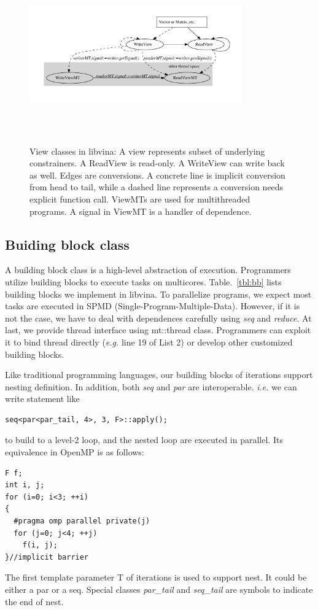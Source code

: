 \begin{figure}
\includegraphics[width=3.6in,height=3.0in]{../relationship_views}
\caption{View classes in libvina: A view represents subset of
  underlying constrainers. A ReadView is read-only. A WriteView
  can write back as well. Edges are  conversions. A concrete line is implicit conversion from head to
  tail, while a dashed line represents a conversion needs explicit function
  call. ViewMTs are used for multithreaded programs. A
  signal in ViewMT is a handler of dependence.}\label{fig:view}
\end{figure}

\subsection{Buiding block class}
A building block class is a high-level abstraction of execution. Programmers
utilize building blocks to execute tasks on multicores.
Table.~\ref{tbl:bb} lists building blocks we implement in libvina. To parallelize programs, we expect most tasks are
executed in SPMD (Single-Program-Multiple-Data). However, if it is
not the case, we have to deal with dependences carefully using \textit{seq} and \textit{reduce}. At last, we
provide thread interface using mt::thread class. Programmers can
exploit it to bind thread directly (\textit{e.g.} line 19 of List 2)
or develop other customized building blocks.

Like traditional programming languages, our
building blocks of iterations support nesting definition. In addition, both \textit{seq} and
\textit{par} are interoperable. \textit{i.e.} we can write statement like 
\begin{lstlisting}
seq<par<par_tail, 4>, 3, F>::apply();
\end{lstlisting}
to build to a level-2 loop, and the nested loop are executed in
parallel. Its equivalence in OpenMP is as follows:
\begin{lstlisting}
F f;
int i, j;
for (i=0; i<3; ++i)
{
  #pragma omp parallel private(j)
  for (j=0; j<4; ++j) 
    f(i, j);
}//implicit barrier
\end{lstlisting}
The first template parameter T  of iterations is used to support nest. It could be
either a par or a seq. Special classes \textit{par\_tail} and \textit{seq\_tail} are
symbols to indicate the end of nest.

